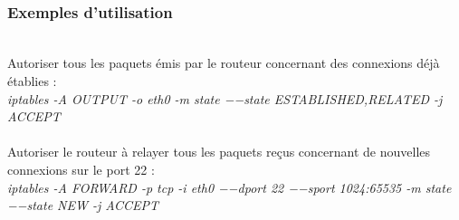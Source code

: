 \documentclass[journal, a4paper]{IEEEtran}
\begin{document}
~\\
\subsubsection{Exemples d'utilisation}
~\\
Autoriser tous les paquets émis par le routeur concernant des connexions déjà établies :\\
\textit{iptables -A OUTPUT -o eth0 -m state −−state ESTABLISHED,RELATED -j ACCEPT}\\
~\\
Autoriser le routeur à relayer tous les paquets reçus concernant de nouvelles connexions sur le port 22 :\\
\textit{iptables -A FORWARD -p tcp -i eth0 −−dport 22 −−sport 1024:65535 -m state −−state NEW -j ACCEPT}\\



\end{document}
